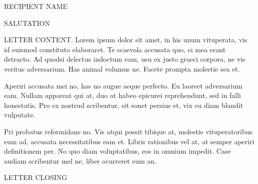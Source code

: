 \documentclass{letter}
\date{6\textsuperscript{th} December 2013}
\begin{document}
\begin{letter}{RECIPIENT NAME}
\opening{SALUTATION}

LETTER CONTENT. Lorem ipsum dolor sit amet, in his unum vituperata, vis id euismod constituto elaboraret. Te scaevola accusata quo, ei mea erant detracto. Ad quodsi delectus indoctum eam, usu ex justo graeci corpora, ne vis veritus adversarium. Has animal volumus ne. Facete prompta molestie sea et.

Aperiri accusata mei no, has no augue aeque perfecto. Eu laoreet adversarium eam. Nullam appareat qui at, duo at habeo epicurei reprehendunt, sed in falli honestatis. Pro ex nostrud scribentur, sit sonet persius et, vix eu diam blandit vulputate.

Pri probatus reformidans no. Vis atqui possit tibique at, molestie vituperatoribus eum ad, accusata necessitatibus eam et. Libris rationibus vel at, at semper aperiri definitionem per. No quo diam voluptatibus, eos in omnium impedit. Case audiam scribentur mel ne, liber ocurreret eum an.

\closing{LETTER CLOSING}
\end{letter}
\end{document}
